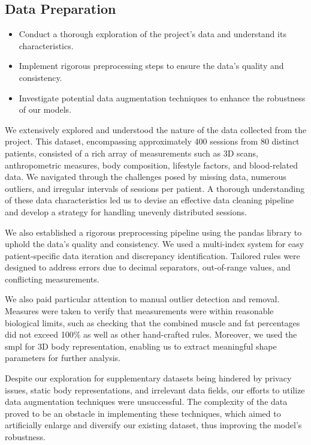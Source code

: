 \subsection{Data Preparation}

\begin{itemize}
      \item Conduct a thorough exploration of the project's data and understand its
            characteristics.
      \item Implement rigorous preprocessing steps to ensure the data's quality and
            consistency.
      \item Investigate potential data augmentation techniques to enhance the robustness of
            our models.
\end{itemize}

We extensively explored and understood the nature of the data collected from
the project. This dataset, encompassing approximately 400 sessions from 80
distinct patients, consisted of a rich array of measurements such as 3D scans,
anthropometric measures, body composition, lifestyle factors, and blood-related
data. We navigated through the challenges posed by missing data, numerous
outliers, and irregular intervals of sessions per patient. A thorough
understanding of these data characteristics led us to devise an effective data
cleaning pipeline and develop a strategy for handling unevenly distributed
sessions.

We also established a rigorous preprocessing pipeline using the \gls{pandas}
library to uphold the data's quality and consistency. We used a multi-index
system for easy patient-specific data iteration and discrepancy identification.
Tailored rules were designed to address errors due to decimal separators,
out-of-range values, and conflicting measurements.

We also paid particular attention to manual outlier detection and removal.
Measures were taken to verify that measurements were within reasonable
biological limits, such as checking that the combined muscle and fat
percentages did not exceed 100\% as well as other hand-crafted rules. Moreover,
we used the \gls{smpl} for 3D body representation, enabling us to extract
meaningful shape parameters for further analysis.

Despite our exploration for supplementary datasets being hindered by privacy
issues, static body representations, and irrelevant data fields, our efforts to
utilize data augmentation techniques were unsuccessful. The complexity of the
data proved to be an obstacle in implementing these techniques, which aimed to
artificially enlarge and diversify our existing dataset, thus improving the
model's robustness.

